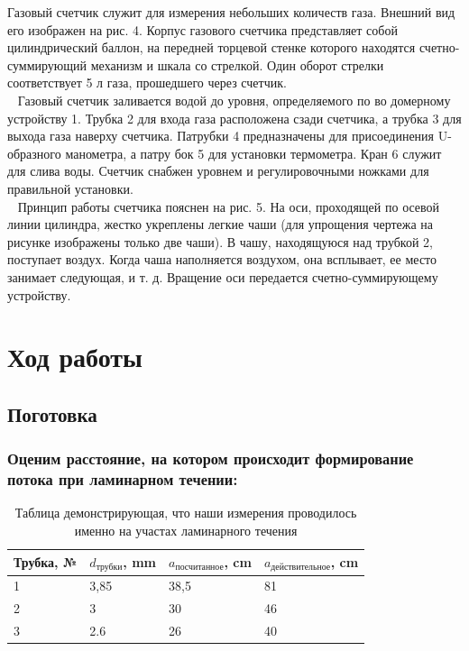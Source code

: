 \documentclass[a4paper,12pt]{article}
\theoremstyle{plain} %
\theoremstyle{definition} %
\theoremstyle{remark} %
\begin{document}
Газовый счетчик служит для измерения небольших количеств газа. Внешний вид его изображен на рис. 4. Корпус газового счетчика представляет собой цилиндрический баллон, на передней торцевой стенке которого находятся счетно-суммирующий механизм и шкала со стрелкой. Один оборот стрелки соответствует 5 л газа, прошедшего через счетчик.
\\[1ex]\
\indent
Газовый счетчик заливается водой до уровня, определяемого по во домерному устройству 1. Трубка 2 для входа газа расположена сзади счетчика, а трубка 3 для выхода газа наверху счетчика. Патрубки 4 предназначены для присоединения U-образного манометра, а патру бок 5 для установки термометра. Кран 6 служит для слива воды. Счетчик снабжен уровнем и регулировочными ножками для правильной установки.
\\[1ex]\
\indent
Принцип работы счетчика пояснен на рис. 5. На оси, проходящей по осевой линии цилиндра, жестко укреплены легкие чаши (для упрощения чертежа на рисунке изображены только две чаши). В чашу, находящуюся над трубкой 2, поступает воздух. Когда чаша наполняется воздухом, она всплывает, ее место занимает следующая, и т. д. Вращение оси передается счетно-суммирующему устройству.

\section{Ход работы}
\subsection{Поготовка}
\subsubsection{Оценим расстояние, на котором происходит формирование потока при ламинарном течении:}

\begin{table}[H]
    \begin{tabular}{|l|l|l|l|}
    \hline
    Трубка, № & $d_{\text{трубки}}$, mm & $a_{\text{посчитанное}}$, cm & $a_{\text{действительное}}$, cm \\ \hline
    1              &    3,85            &    38,5        &    81   \\[0.3ex]
    2              &    3               & 30             & 46      \\[0.3ex]
    3              & 2.6                & 26             & 40      \\ \hline
    \end{tabular}
    \caption {Таблица демонстрирующая, что наши измерения проводилось именно на участах ламинарного течения}
\end{table}
\end{document}
